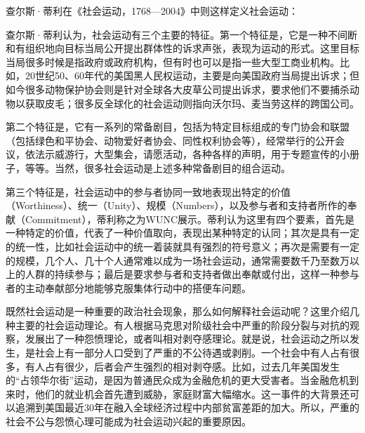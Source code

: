 查尔斯·蒂利在《社会运动，1768—2004》中则这样定义社会运动：


查尔斯·蒂利认为，社会运动有三个主要的特征。第一个特征是，它是一种不间断和有组织地向目标当局公开提出群体性的诉求声张，表现为运动的形式。这里目标当局很多时候是指政府或政府机构，但有时也可以是指一些大型工商业机构。比如，20世纪50、60年代的美国黑人民权运动，主要是向美国政府当局提出诉求；但如今很多动物保护协会则是针对全球各大皮草公司提出诉求，要求他们不要捕杀动物以获取皮毛；很多反全球化的社会运动则指向沃尔玛、麦当劳这样的跨国公司。

第二个特征是，它有一系列的常备剧目，包括为特定目标组成的专门协会和联盟（包括绿色和平协会、动物爱好者协会、同性权利协会等），经常举行的公开会议，依法示威游行，大型集会，请愿活动，各种各样的声明，用于专题宣传的小册子，等等。当然，很多社会运动是上述多种常备剧目的组合运动。

第三个特征是，社会运动中的参与者协同一致地表现出特定的价值（Worthiness）、统一（Unity）、规模（Numbers），以及参与者和支持者所作的奉献（Commitment），蒂利称之为WUNC展示。蒂利认为这里有四个要素，首先是一种特定的价值，代表了一种价值取向，表现出某种特定的认同；其次是具有一定的统一性，比如社会运动中的统一着装就具有强烈的符号意义；再次是需要有一定的规模，几个人、几十个人通常难以成为一场社会运动，通常需要数千乃至数万以上的人群的持续参与；最后是要求参与者和支持者做出奉献或付出，这样一种参与者的主动奉献部分地能够克服集体行动中的搭便车问题。

既然社会运动是一种重要的政治社会现象，那么如何解释社会运动呢？这里介绍几种主要的社会运动理论。有人根据马克思对阶级社会中严重的阶段分裂与对抗的观察，发展出了一种怨愤理论，或者叫相对剥夺感理论。就是说，社会运动之所以发生，是社会上有一部分人口受到了严重的不公待遇或剥削。一个社会中有人占有很多，有人占有很少，后者会产生强烈的相对剥夺感。比如，过去几年美国发生的“占领华尔街”运动，是因为普通民众成为金融危机的更大受害者。当金融危机到来时，他们的就业机会首先遭到威胁，家庭财富大幅缩水。这一事件的大背景还可以追溯到美国最近30年在融入全球经济过程中内部贫富差距的加大。所以，严重的社会不公与怨愤心理可能成为社会运动兴起的重要原因。

